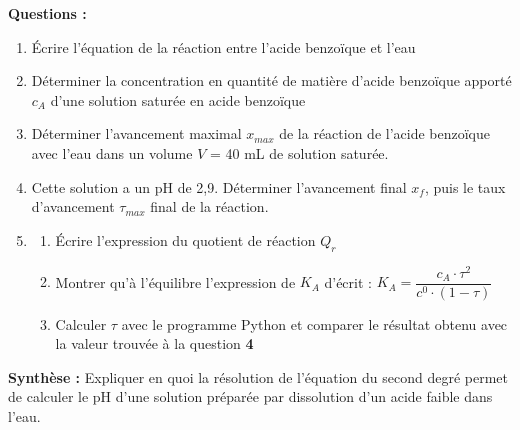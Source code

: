 \documentclass[a4paper,11pt,fleqn]{article}%
\begin{document}
\noindent
{}

\textbf{Questions :} \\
\begin{enumerate}
	\item Écrire l'équation de la réaction entre l'acide benzoïque et l'eau
	\item Déterminer la concentration en quantité de matière d'acide benzoïque apporté $c_A$ d'une solution saturée en acide benzoïque
	\item Déterminer l'avancement maximal $x_{max}$ de la réaction de l'acide benzoïque avec l'eau dans un volume $V$ = \num{40} \unit{\milli \liter} de solution saturée.
	\item Cette solution a un pH de 2,9. Déterminer l'avancement final $x_f$, puis le taux d'avancement $\tau_{max}$ final de la réaction.
	\item \begin{enumerate}
		\item Écrire l'expression du quotient de réaction $Q_r$
		\item Montrer qu'à l'équilibre l'expression de $K_A$ d'écrit : $K_A=\dfrac{c_A \cdot \tau^2}{c^0 \cdot (1-\tau)}$
		\item Calculer $\tau$ avec le programme Python et comparer le résultat obtenu avec la valeur trouvée à la question \textbf{4}
	\end{enumerate}
\end{enumerate}
\textbf{Synthèse : } Expliquer en quoi la résolution de l'équation du second degré permet de calculer le pH d'une solution préparée par dissolution d'un acide faible dans l'eau.
\end{document}

